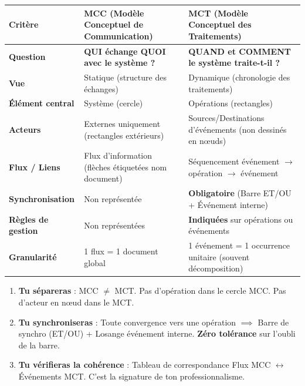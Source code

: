 \documentclass[11pt]{article}
\begin{document}
\begin{definition}
\begin{center}
\begin{tabularx}{\linewidth}{|>{\bfseries}l|X|X|}
\hline
\rowcolor{popblueL}
\textbf{Critère} & \textbf{MCC (Modèle Conceptuel de Communication)} & \textbf{MCT (Modèle Conceptuel des Traitements)} \\ \hline
\textbf{Question} & \textbf{QUI échange QUOI avec le système ?} & \textbf{QUAND et COMMENT le système traite-t-il ?} \\ \hline
\textbf{Vue} & Statique (structure des échanges) & Dynamique (chronologie des traitements) \\ \hline
\textbf{Élément central} & Système (cercle) & Opérations (rectangles) \\ \hline
\textbf{Acteurs} & Externes uniquement (rectangles extérieurs) & Sources/Destinations d'événements (non dessinés en nœuds) \\ \hline
\textbf{Flux / Liens} & Flux d'information (flèches étiquetées nom document) & Séquencement événement $\rightarrow$ opération $\rightarrow$ événement \\ \hline
\textbf{Synchronisation} & Non représentée & \textbf{Obligatoire} (Barre ET/OU + Événement interne) \\ \hline
\textbf{Règles de gestion} & Non représentées & \textbf{Indiquées} sur opérations ou événements \\ \hline
\textbf{Granularité} & 1 flux = 1 document global & 1 événement = 1 occurrence unitaire (souvent décomposition) \\ \hline
\end{tabularx}
\end{center}
\end{definition}

\begin{aretenir}
\begin{enumerate}
    \item \textbf{Tu sépareras} : MCC $\neq$ MCT. Pas d'opération dans le cercle MCC. Pas d'acteur en nœud dans le MCT.
    \item \textbf{Tu synchroniseras} : Toute convergence vers une opération $\implies$ Barre de synchro (ET/OU) + Losange événement interne. \textbf{Zéro tolérance} sur l'oubli de la barre.
    \item \textbf{Tu vérifieras la cohérence} : Tableau de correspondance Flux MCC $\leftrightarrow$ Événements MCT. C'est la signature de ton professionnalisme.
\end{enumerate}
\end{aretenir}
\end{document}
